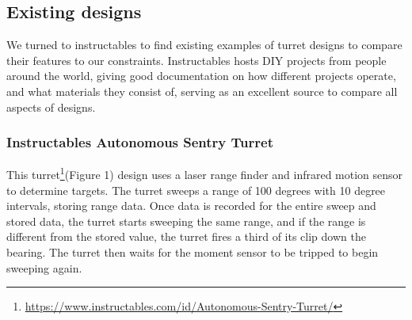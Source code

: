 ﻿%


\subsection{Existing designs}

 
We turned to instructables to find existing examples of turret designs to compare their features to our constraints. Instructables hosts DIY projects from people around the world, giving good documentation on how different projects operate, and what materials they consist of, serving as an excellent source to compare all aspects of designs.
\subsubsection{Instructables Autonomous Sentry Turret}
This turret\footnote{\url{https://www.instructables.com/id/Autonomous-Sentry-Turret/}}(Figure 1) design uses a laser range finder and infrared motion sensor to determine targets. The turret sweeps a range of 100 degrees with 10 degree intervals, storing range data. Once data is recorded for the entire sweep and stored data, the turret starts sweeping the same range, and if the range is different from the stored value, the turret fires a third of its clip down the bearing. The turret then waits for the moment sensor to be tripped to begin sweeping again.



